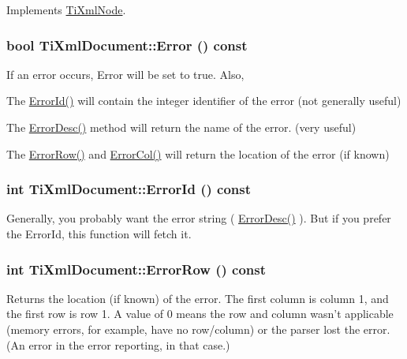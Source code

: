 Implements \hyperlink{class_ti_xml_node_a4508cc3a2d7a98e96a54cc09c37a78a4}{TiXmlNode}.\hypertarget{class_ti_xml_document_a6dfc01a6e5d58e56acd537dfd3bdeb29}{
\subsubsection[{Error}]{\setlength{\rightskip}{0pt plus 5cm}bool TiXmlDocument::Error () const}}
\label{class_ti_xml_document_a6dfc01a6e5d58e56acd537dfd3bdeb29}
If an error occurs, Error will be set to true. Also,
\begin{DoxyItemize}
\item The \hyperlink{class_ti_xml_document_af96fc2f3f9ec6422782bfe916c9e778f}{ErrorId()} will contain the integer identifier of the error (not generally useful)
\item The \hyperlink{class_ti_xml_document_a9d0f689f6e09ea494ea547be8d79c25e}{ErrorDesc()} method will return the name of the error. (very useful)
\item The \hyperlink{class_ti_xml_document_af30efc75e804aa2e92fb8be3a8cb676e}{ErrorRow()} and \hyperlink{class_ti_xml_document_aa90bc630ee5203c6109ca5fad3323649}{ErrorCol()} will return the location of the error (if known) 
\end{DoxyItemize}\hypertarget{class_ti_xml_document_af96fc2f3f9ec6422782bfe916c9e778f}{
\subsubsection[{ErrorId}]{\setlength{\rightskip}{0pt plus 5cm}int TiXmlDocument::ErrorId () const}}
\label{class_ti_xml_document_af96fc2f3f9ec6422782bfe916c9e778f}
Generally, you probably want the error string ( \hyperlink{class_ti_xml_document_a9d0f689f6e09ea494ea547be8d79c25e}{ErrorDesc()} ). But if you prefer the ErrorId, this function will fetch it. \hypertarget{class_ti_xml_document_af30efc75e804aa2e92fb8be3a8cb676e}{
\subsubsection[{ErrorRow}]{\setlength{\rightskip}{0pt plus 5cm}int TiXmlDocument::ErrorRow () const}}
\label{class_ti_xml_document_af30efc75e804aa2e92fb8be3a8cb676e}
Returns the location (if known) of the error. The first column is column 1, and the first row is row 1. A value of 0 means the row and column wasn't applicable (memory errors, for example, have no row/column) or the parser lost the error. (An error in the error reporting, in that case.)


